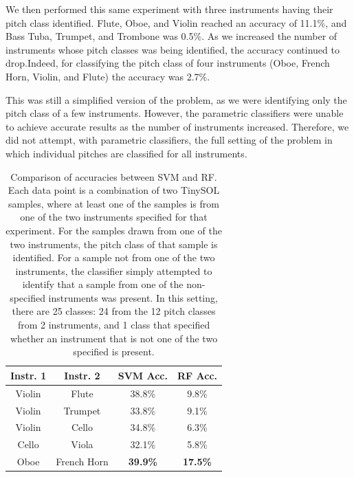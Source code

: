 \documentclass{article}
\begin{document}
We then performed this same experiment with three instruments having their pitch class identified. Flute, Oboe, and Violin reached an accuracy of 11.1\%, and Bass Tuba, Trumpet, and Trombone was 0.5\%. As we increased the number of instruments whose pitch classes was being identified, the accuracy continued to drop.Indeed, for classifying the pitch class of four instruments (Oboe, French Horn, Violin, and Flute) the accuracy was 2.7\%.

This was still a simplified version of the problem, as we were identifying only the pitch class of a few instruments. However, the parametric classifiers were unable to achieve accurate results as the number of instruments increased. Therefore, we did not attempt, with parametric classifiers, the full setting of the problem in which individual pitches are classified for all instruments. 

\begin{table}
  \begin{center}
    \begin{tabular}{|c|c|c|c|} 
    	  \hline
      \textbf{Instr. 1} & \textbf{Instr. 2} & \textbf{SVM Acc.} & \textbf{RF Acc.}\\
      \hline
      Violin & Flute & 38.8\% & 9.8\% \\
      \hline
      Violin & Trumpet & 33.8\% & 9.1\% \\
      \hline
      Violin & Cello & 34.8\% & 6.3\% \\
      \hline
      Cello & Viola & 32.1\% & 5.8\% \\
      \hline
      Oboe & French Horn & \textbf{39.9\%} & \textbf{17.5\%} \\
      \hline
    \end{tabular}
  \end{center}
  \caption{Comparison of accuracies between SVM and RF. Each data point is a combination of two TinySOL samples, where at least one of the samples is from one of the two instruments specified for that experiment. For the samples drawn from one of the two instruments, the pitch class of that sample is identified. For a sample not from one of the two instruments, the classifier simply attempted to identify that a sample from one of the non-specified instruments was present. In this setting, there are 25 classes: 24 from the 12 pitch classes from 2 instruments, and 1 class that specified whether an instrument that is not one of the two specified is present. \label{tab:baselines}}
\end{table}
\end{document}
